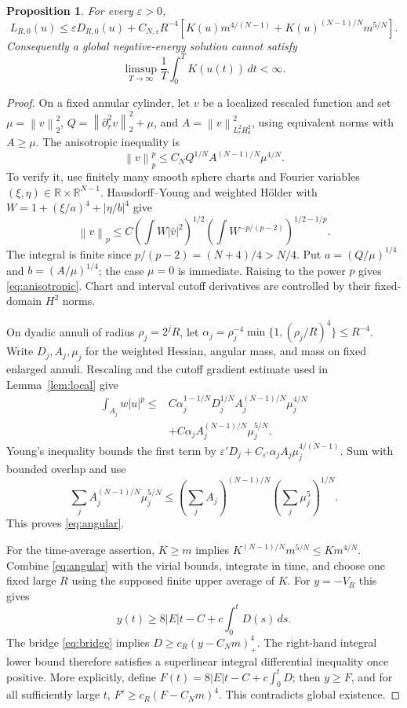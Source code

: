 \documentclass[11pt,a4paper]{article}
\newtheorem{proposition}[theorem]{Proposition}
\theoremstyle{remark}\newtheorem{remark}[theorem]{Remark}
\newcommand{\R}{\mathbb R}
\newcommand{\norm}[1]{\left\|#1\right\|}
\begin{document}
\begin{proposition}\label{prop:angular}
For every $\varepsilon>0$,
\begin{equation}\label{eq:angular}
 L_{R,0}(u)\le\varepsilon D_{R,0}(u)+C_{N,\varepsilon}R^{-4}
 \left[K(u)m^{4/(N-1)}+K(u)^{(N-1)/N}m^{5/N}\right].
\end{equation}
Consequently a global negative-energy solution cannot satisfy
\[
 \limsup_{T\to\infty}\frac1T\int_0^T K(u(t))\,dt<\infty.
\]
\end{proposition}
\begin{proof}
On a fixed annular cylinder, let $v$ be a localized rescaled function and set
$\mu=\norm v_2^2$, $Q=\norm{\partial_r^2v}_2^2+\mu$, and
$A=\norm v_{L_r^2H_\theta^2}^2$, using equivalent norms with $A\ge\mu$. The anisotropic inequality is
\begin{equation}\label{eq:anisotropic}
 \norm v_p^p\le C_NQ^{1/N}A^{(N-1)/N}\mu^{4/N}.
\end{equation}
To verify it, use finitely many smooth sphere charts and Fourier variables $(\xi,\eta)\in\R\times\R^{N-1}$. Hausdorff--Young and weighted H\"older with
$W=1+(\xi/a)^4+|\eta/b|^4$ give
\[
 \norm v_p\le C\left(\int W|\widehat v|^2\right)^{1/2}
 \left(\int W^{-p/(p-2)}\right)^{1/2-1/p}.
\]
The integral is finite since $p/(p-2)=(N+4)/4>N/4$. Put
$a=(Q/\mu)^{1/4}$ and $b=(A/\mu)^{1/4}$; the case $\mu=0$ is immediate. Raising to the power $p$ gives \eqref{eq:anisotropic}. Chart and interval cutoff derivatives are controlled by their fixed-domain $H^2$ norms.

On dyadic annuli of radius $\rho_j=2^jR$, let
$\alpha_j=\rho_j^{-4}\min\{1,(\rho_j/R)^4\}\le R^{-4}$. Write $D_j,A_j,\mu_j$ for the weighted Hessian, angular mass, and mass on fixed enlarged annuli. Rescaling and the cutoff gradient estimate used in Lemma~\ref{lem:local} give
\begin{align*}
 \int_{A_j}w|u|^p\le{}&C\alpha_j^{1-1/N}D_j^{1/N}A_j^{(N-1)/N}\mu_j^{4/N}\\
 &+C\alpha_j A_j^{(N-1)/N}\mu_j^{5/N}.
\end{align*}
Young's inequality bounds the first term by
$\varepsilon' D_j+C_{\varepsilon'}\alpha_j A_j\mu_j^{4/(N-1)}$.
Sum with bounded overlap and use
\[
 \sum_j A_j^{(N-1)/N}\mu_j^{5/N}
 \le\left(\sum_jA_j\right)^{(N-1)/N}\left(\sum_j\mu_j^5\right)^{1/N}.
\]
This proves \eqref{eq:angular}.

For the time-average assertion, $K\ge m$ implies
$K^{(N-1)/N}m^{5/N}\le Km^{4/N}$. Combine \eqref{eq:angular} with the virial bounds, integrate in time, and choose one fixed large $R$ using the supposed finite upper average of $K$. For $y=-V_R$ this gives
\[
 y(t)\ge8|E|t-C+c\int_0^t D(s)\,ds.
\]
The bridge \eqref{eq:bridge} implies $D\ge c_R(y-C_Nm)_+^4$. The right-hand integral lower bound therefore satisfies a superlinear integral differential inequality once positive. More explicitly, define
$F(t)=8|E|t-C+c\int_0^tD$; then $y\ge F$, and for all sufficiently large $t$,
$F'\ge c_R(F-C_Nm)^4$. This contradicts global existence.
\end{proof}
\end{document}
